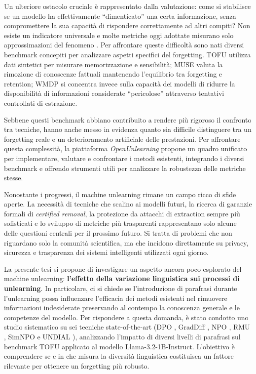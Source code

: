 Un ulteriore ostacolo cruciale è rappresentato dalla valutazione: come si stabilisce se un modello ha effettivamente ``dimenticato'' una certa informazione, senza compromettere la sua capacità di rispondere correttamente ad altri compiti? Non esiste un indicatore universale e molte metriche oggi adottate misurano solo approssimazioni del fenomeno \cite{kim2025evaluation, doshi2024blackbox}. Per affrontare queste difficoltà sono nati diversi benchmark concepiti per analizzare aspetti specifici del forgetting. TOFU \cite{maini2024tofu} utilizza dati sintetici per misurare memorizzazione e sensibilità; MUSE \cite{shi2025muse} valuta la rimozione di conoscenze fattuali mantenendo l’equilibrio tra forgetting e retention; WMDP \cite{li2024wmdpbenchmarkmeasuringreducing} si concentra invece sulla capacità dei modelli di ridurre la disponibilità di informazioni considerate “pericolose” attraverso tentativi controllati di estrazione.

Sebbene questi benchmark abbiano contribuito a rendere più rigoroso il confronto tra tecniche, hanno anche messo in evidenza quanto sia difficile distinguere tra un forgetting reale e un deterioramento artificiale delle prestazioni. Per affrontare questa complessità, la piattaforma \emph{OpenUnlearning} \cite{openunlearning2025} propone un quadro unificato per implementare, valutare e confrontare i metodi esistenti, integrando i diversi benchmark e offrendo strumenti utili per analizzare la robustezza delle metriche stesse.

Nonostante i progressi, il machine unlearning rimane un campo ricco di sfide aperte. La necessità di tecniche che scalino ai modelli futuri, la ricerca di garanzie formali di \emph{certified removal}, la protezione da attacchi di extraction sempre più sofisticati e lo sviluppo di metriche più trasparenti rappresentano solo alcune delle questioni centrali per il prossimo futuro. Si tratta di problemi che non riguardano solo la comunità scientifica, ma che incidono direttamente su privacy, sicurezza e trasparenza dei sistemi intelligenti utilizzati ogni giorno.

La presente tesi si propone di investigare un aspetto ancora poco esplorato del machine unlearning: \textbf{l'effetto della variazione linguistica sui processi di unlearning}. In particolare, ci si chiede se l'introduzione di parafrasi durante l'unlearning possa influenzare l'efficacia dei metodi esistenti nel rimuovere informazioni indesiderate preservando al contempo la conoscenza generale e le competenze del modello. Per rispondere a questa domanda, è stato condotto uno studio sistematico su sei tecniche state-of-the-art (DPO \cite{maini2024tofu}, GradDiff \cite{maini2024tofu}, NPO \cite{zhang_negative_2024}, RMU \cite{li2024wmdpbenchmarkmeasuringreducing}, SimNPO \cite{fan_simplicity_2024} e UNDIAL \cite{dong_undial_2024}), analizzando l'impatto di diversi livelli di parafrasi sul benchmark TOFU \cite{maini2024tofu} applicato al modello Llama-3.2-1B-Instruct. L'obiettivo è comprendere se e in che misura la diversità linguistica costituisca un fattore rilevante per ottenere un forgetting più robusto.